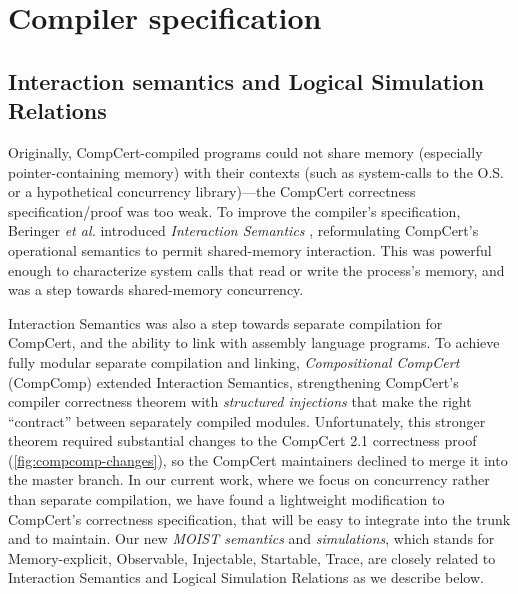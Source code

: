 \section{Compiler specification}
\label{sec:copmilerspec}

\subsection*{Interaction semantics and Logical Simulation Relations}

Originally, CompCert-compiled programs could not share memory (especially pointer-containing memory) with
their contexts (such as system-calls to the O.S. or a hypothetical concurrency library)---the CompCert correctness specification/proof
was too weak.  To improve the compiler's specification, Beringer
\emph{et al.} introduced \emph{Interaction Semantics}
\cite{bsda:esop2014}, reformulating CompCert's operational semantics
to permit shared-memory interaction.  This was powerful enough to
characterize system calls that read or write the process's memory,
and was a step towards shared-memory concurrency.

\begin{table}
\caption[Changes to CompCert for CompComp]{Comparing lines of code for selected compiler passes in CompCert, CompComp and our work.}\label{fig:compcomp-changes}
\end{table}

 Interaction Semantics was also a step towards separate compilation for CompCert, and the ability to link
 with assembly language programs. To achieve fully modular separate compilation and linking,
\emph{Compositional CompCert} (CompComp) \cite{compcomp}
extended Interaction Semantics,
strengthening CompCert's compiler
correctness theorem with \emph{structured injections} that
make the right ``contract'' between separately compiled modules.
Unfortunately, this stronger theorem required substantial changes
to the CompCert 2.1 correctness proof (\cref{fig:compcomp-changes}), so the CompCert
maintainers declined to merge it into the master branch.  In our current work,
where we focus on concurrency rather than separate compilation,
we have found a lightweight modification to CompCert's
correctness specification, that will be easy to integrate
into the trunk and to maintain. Our new \emph{MOIST semantics} and \emph{simulations}, which stands for Memory-explicit, Observable, Injectable, Startable, Trace,  are closely related to Interaction Semantics and Logical Simulation Relations as we describe below.

